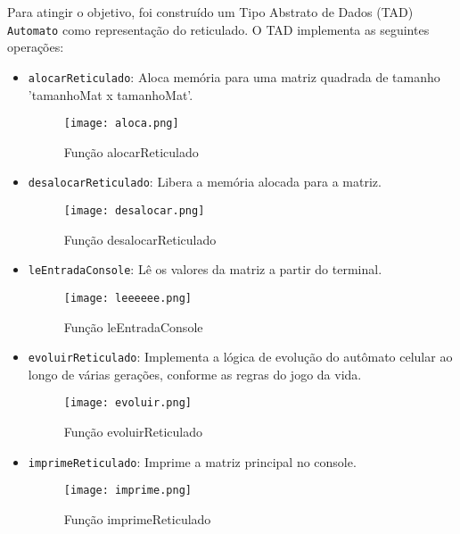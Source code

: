 \documentclass[a4paper,12pt]{article}
\begin{document}
Para atingir o objetivo, foi construído um Tipo Abstrato de Dados (TAD) \texttt{Automato} como representação do reticulado. O TAD implementa as seguintes operações:
\begin{itemize}

    \item \texttt{alocarReticulado}: Aloca memória para uma matriz quadrada de tamanho 'tamanhoMat x tamanhoMat'.

    \begin{figure}[H]
        \centering
        \texttt{[image: aloca.png]}
        \caption{Função alocarReticulado}
        \label{fig:enter-label1}
    \end{figure}
    
    
    \item \texttt{desalocarReticulado}: Libera a memória alocada para a matriz.

    \begin{figure}[H]
        \centering
        \texttt{[image: desalocar.png]}
        \caption{Função desalocarReticulado}
        \label{fig:enter-label2}
    \end{figure}    
    
    \item \texttt{leEntradaConsole}: Lê os valores da matriz a partir do terminal.

    \begin{figure}[H]
        \centering
        \texttt{[image: leeeeee.png]}
        \caption{Função leEntradaConsole}
        \label{fig:enter-label3}
    \end{figure}
    
    \item \texttt{evoluirReticulado}: Implementa a lógica de evolução do autômato celular ao longo de várias gerações, conforme as regras do jogo da vida.

    \begin{figure}[H]
        \centering
        \texttt{[image: evoluir.png]}
        \caption{Função evoluirReticulado}
        \label{fig:enter-label4}
    \end{figure}  
    
    \item \texttt{imprimeReticulado}: Imprime a matriz principal no console.

    \begin{figure}[H]
        \centering
        \texttt{[image: imprime.png]}
        \caption{Função imprimeReticulado}
        \label{fig:enter-label5}
    \end{figure}
    
\end{itemize}
\end{document}
